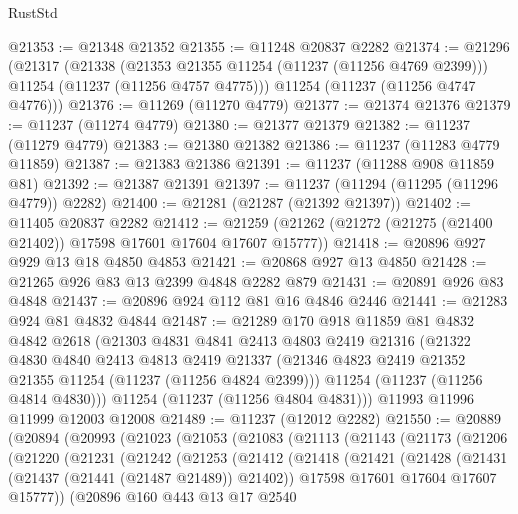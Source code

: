 \begin{lexlean}{RustStd}
\begin{coremodule}
@21353 := @21348 @21352
@21355 := @11248 @20837 @2282
@21374 := @21296
    (@21317
      (@21338
        (@21353 @21355 @11254 (@11237 (@11256 @4769 @2399)))
        @11254
        (@11237 (@11256 @4757 @4775)))
      @11254
      (@11237 (@11256 @4747 @4776)))
@21376 := @11269 (@11270 @4779)
@21377 := @21374 @21376
@21379 := @11237 (@11274 @4779)
@21380 := @21377 @21379
@21382 := @11237 (@11279 @4779)
@21383 := @21380 @21382
@21386 := @11237 (@11283 @4779 @11859)
@21387 := @21383 @21386
@21391 := @11237 (@11288 @908 @11859 @81)
@21392 := @21387 @21391
@21397 := @11237 (@11294 (@11295 (@11296 @4779)) @2282)
@21400 := @21281 (@21287 (@21392 @21397))
@21402 := @11405 @20837 @2282
@21412 := @21259 (@21262 (@21272 (@21275 (@21400 @21402)) @17598 @17601 @17604 @17607 @15777))
@21418 := @20896 @927 @929 @13 @18 @4850 @4853
@21421 := @20868 @927 @13 @4850
@21428 := @21265 @926 @83 @13 @2399 @4848 @2282 @879
@21431 := @20891 @926 @83 @4848
@21437 := @20896 @924 @112 @81 @16 @4846 @2446
@21441 := @21283 @924 @81 @4832 @4844
@21487 := @21289
    @170
    @918
    @11859
    @81
    @4832
    @4842
    @2618
    (@21303
      @4831
      @4841
      @2413
      @4803
      @2419
      @21316
      (@21322
        @4830
        @4840
        @2413
        @4813
        @2419
        @21337
        (@21346 @4823 @2419 @21352 @21355 @11254 (@11237 (@11256 @4824 @2399)))
        @11254
        (@11237 (@11256 @4814 @4830)))
      @11254
      (@11237 (@11256 @4804 @4831)))
    @11993
    @11996
    @11999
    @12003
    @12008
@21489 := @11237 (@12012 @2282)
@21550 := @20889
    (@20894
      (@20993
        (@21023
          (@21053
            (@21083
              (@21113
                (@21143
                  (@21173
                    (@21206
                      (@21220
                        (@21231
                          (@21242
                            (@21253
                              (@21412
                                (@21418
                                  (@21421
                                    (@21428
                                      (@21431 (@21437 (@21441 (@21487 @21489)) @21402))
                                      @17598
                                      @17601
                                      @17604
                                      @17607
                                      @15777))
                                  (@20896
                                    @160
                                    @443
                                    @13
                                    @17
                                    @2540

\end{coremodule}
\end{lexlean}
